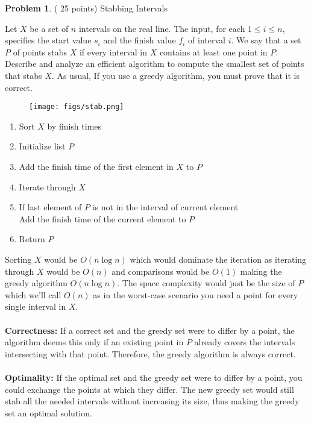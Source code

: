 \documentclass[11pt]{article}
\theoremstyle{definition}
\theoremstyle{theorem}
\newtheorem{prob}{Problem}
\begin{document}
\newpage

\begin{prob}{(
25 points) Stabbing Intervals}\end{prob}

Let $X$ be a set of $n$ intervals on the real line. The input, for each $1 \leq i \leq n$, specifies the start value $s_i$ and the finish value $f_i$ of interval $i$. We say that a set $P$ of points stabs $X$ if every interval in $X$ contains at least one point in $P$. Describe and analyze an efficient algorithm to compute the smallest set of points that stabs $X$. As usual, If you use a greedy algorithm, you must prove that it is correct.

\begin{figure}[h]
    \centering
    \texttt{[image: figs/stab.png]}
\end{figure}
\begin{enumerate}
  \item Sort $X$ by finish times
  \item Initialize list $P$
  \item Add the finish time of the first element in $X$ to $P$
  \item Iterate through $X$
  \item If last element of $P$ is not in the interval of current element \\
  Add the finish time of the current element to $P$
  \item Return $P$
\end{enumerate}
Sorting $X$ would be $O(n \log n)$ which would dominate the iteration as iterating through $X$ would be $O(n)$ and comparisons would be $O(1)$ making the greedy algorithm $O(n \log n)$. The space complexity would just be the size of $P$ which we'll call $O(n)$ as in the worst-case scenario you need a point for every single interval in $X$.\\\\
\textbf{Correctness:} If a correct set and the greedy set were to differ by a point, the algorithm deems this only if an existing point in $P$ already covers the intervals intersecting with that point. Therefore, the greedy algorithm is always correct. \\\\
\textbf{Optimality:} If the optimal set and the greedy set were to differ by a point, you could exchange the points at which they differ. The new greedy set would still stab all the needed intervals without increasing its size, thus making the greedy set an optimal solution.
\end{document}
